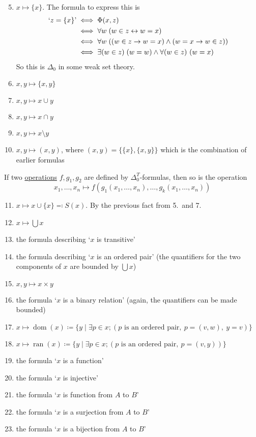 \documentclass{article}
\newcommand{\1}{\mathbbm{1}}
\DeclareMathOperator{\dom}{dom}
\DeclareMathOperator{\ran}{ran}
\begin{document}
\begin{enumerate}
  \setcounter{enumi}{4}
  \item $x \mapsto \{x\}$. The formula to express this is
    \begin{align*}
      `z = \{x\}\text{'} &\iff \Phi(x,z) \\
                  &\iff \forall w \; (w \in z \leftrightarrow w = x) \\
                  &\iff \forall w \; ((w \in z \rightarrow w = x) \land (w = x \rightarrow w \in z)) \\
                  &\iff \exists (w \in z) \; (w = w) \land \forall (w \in z) \ (w = x)
    \end{align*}
    So this is $\Delta_0$ in some weak set theory.
  \item $x,y \mapsto \{x,y\}$
  \item $x,y \mapsto x \cup y$
  \item $x,y \mapsto x \cap y$
  \item $x,y \mapsto x \setminus y$
  \item $x,y \mapsto (x,y)$, where $(x,y) = \{\{x\},\{x,y\}\}$ which is the combination of earlier formulas
\end{enumerate}
If two \hyperlink{def:operation}{operations} $f, g_1, g_2$ are defined by $\Delta_0^T$-formulas, then so is the operation
\begin{equation*}
  x_1, \dotsc, x_n \mapsto f(g_1(x_1, \dotsc, x_n), \dotsc, g_k(x_1, \dotsc, x_n))
\end{equation*}
\begin{enumerate}
  \setcounter{enumi}{10}
  \item $x \mapsto x \cup \{x\} \eqqcolon S(x)$.
    By the previous fact from 5.\ and 7.
  \item $x \mapsto \bigcup x$
  \item the formula describing `$x$ is transitive'
  \item the formula describing `$x$ is an ordered pair' (the quantifiers for the two components of $x$ are bounded by $\bigcup x$)
  \item $x,y \mapsto x \times y$
  \item the formula `$x$ is a binary relation' (again, the quantifiers can be made bounded)
  \item $x \mapsto \dom(x) \coloneqq \{y \mid \exists p \in x; (p\text{ is an ordered pair},\ p = (v,w),\ y=v)\}$
  \item $x \mapsto \ran(x) \coloneqq \{y \mid \exists p \in x; (p\text{ is an ordered pair},\ p = (v,y))\}$
  \item the formula `$x$ is a function'
  \item the formula `$x$ is injective'
  \item the formula `$x$ is function from $A$ to $B$'
  \item the formula `$x$ is a surjection from $A$ to $B$'
  \item the formula `$x$ is a bijection from $A$ to $B$'
\end{enumerate}
\end{document}
